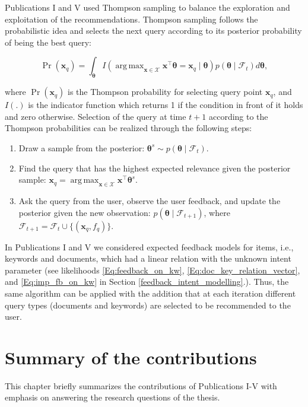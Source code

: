 \documentclass[dissertation,math,vertlayout,pdfa,colorlinks]{aaltoseries}
\newcommand{\bF}{\mathcal{F}}
\newcommand{\tp}{^{\top}}
\DeclareMathOperator*{\argmax}{arg\,max}
\begin{document}
Publications I and V used Thompson sampling to balance the exploration and exploitation of the recommendations. Thompson sampling follows the probabilistic idea and selects the next query according to its posterior probability of being the best query:  

\begin{equation}\label{Eq:Thompson}
\Pr(\bm{x}_{q})=\!\!\int_{\bm{\theta}}\!\!I(\argmax_{\bm{x} \in \mathcal{X}} \bm{x}\tp \bm{\theta} \!=\!\bm{x}_{q}\!\!\mid \!\bm{\theta}) p(\bm{\theta} \mid \bF_t) d\bm{\theta},
\end{equation}
 

\noindent where $\Pr(\bm{x}_{q})$ is the Thompson probability for selecting query point $\bm{x}_{q}$, and $I(.)$ is the indicator function which returns 1 if the condition in front of it holds and zero otherwise. Selection of the query at time $t+1$ according to the Thompson probabilities can be realized through the following steps:

\begin{enumerate}
	\item Draw a sample from the posterior: $ \bm{\theta}^s \sim p(\bm{\theta} \mid \bF_t)$.
	\item Find the query that has the highest expected relevance given the posterior sample: $\bm{x}_{q} = \argmax_{\bm{x} \in \mathcal{X}} \bm{x}\tp \bm{\theta}^s$.
	\item Ask the query from the user, observe the user feedback, and update the posterior given the new observation: $p(\bm{\theta} \mid \bF_{t+1})$, where $ \bF_{t+1} = \bF_{t} \cup \{(\bm{x}_{q},f_q)\}$.
\end{enumerate}

In Publications I and V we considered expected feedback models for items, i.e., keywords and documents, which had a linear relation with the unknown intent parameter (see likelihoods  \ref{Eq:feedback_on_kw}, \ref{Eq:doc_key_relation_vector}, and \ref{Eq:imp_fb_on_kw} in Section \ref{feedback_intent_modelling}.). Thus, the same algorithm can be applied with the addition that at each iteration different query types (documents and keywords) are selected to be recommended to the user.


\chapter{Summary of the contributions}
This chapter briefly summarizes the contributions of Publications I-V with emphasis on answering the research questions of the thesis. %
\end{document}
